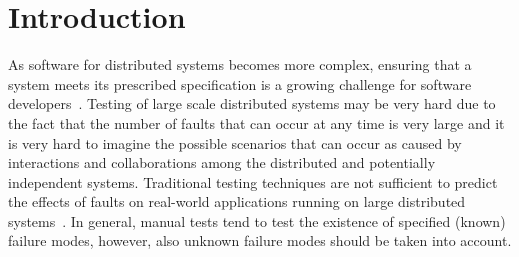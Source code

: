 \section{Introduction}
    
 
    
    
As software for distributed systems becomes more complex, ensuring that a system meets its prescribed specification is a growing challenge for software developers~\cite{dawson1996testing}. Testing of large scale distributed systems may be very hard due to the fact that the number of faults that can occur at any time is very large and it is very hard to imagine the possible scenarios that can occur as caused by interactions and collaborations among the distributed and potentially independent systems. 
Traditional testing techniques are not sufficient to predict the effects of faults on real-world applications running on large distributed systems~\cite{FaaS}. In general, manual 
tests tend to test the existence of specified (known) failure modes, however, also %
unknown failure modes  should be taken into account.

